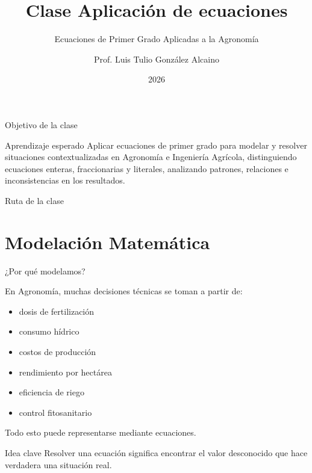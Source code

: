 \documentclass[aspectratio=169]{beamer}
\title{Clase Aplicación de ecuaciones}
\subtitle{Ecuaciones de Primer Grado Aplicadas a la Agronomía}
\author{Prof. Luis Tulio González Alcaino}
\institute{Universidad Santo Tomás\\Departamento de Ciencias Básicas}
\date{2026}
\begin{document}
	
	\begin{frame}
		\titlepage
	\end{frame}
	
	\begin{frame}{Objetivo de la clase}
		\begin{block}{Aprendizaje esperado}
			Aplicar ecuaciones de primer grado para modelar y resolver
			situaciones contextualizadas en Agronomía e Ingeniería Agrícola,
			distinguiendo ecuaciones enteras, fraccionarias y literales,
			analizando patrones, relaciones e inconsistencias en los resultados.
		\end{block}
	\end{frame}
	
	\begin{frame}{Ruta de la clase}
		\tableofcontents
	\end{frame}
	
	\section{Modelación Matemática}
	
	\begin{frame}{¿Por qué modelamos?}
		
		En Agronomía, muchas decisiones técnicas se toman a partir de:
		
		\begin{itemize}
			\item dosis de fertilización
			\item consumo hídrico
			\item costos de producción
			\item rendimiento por hectárea
			\item eficiencia de riego
			\item control fitosanitario
		\end{itemize}
		
		Todo esto puede representarse mediante ecuaciones.
		
		\begin{block}{Idea clave}
			Resolver una ecuación significa encontrar el valor desconocido
			que hace verdadera una situación real.
		\end{block}
		
	\end{frame}
	
\end{document}

